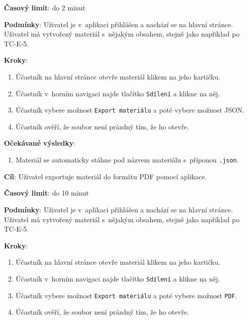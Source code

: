 \textbf{Časový limit}: do 2 minut

\textbf{Podmínky}:  Uživatel je v~aplikaci přihlášen a nachází se na hlavní stránce. Uživatel má vytvořený materiál s~nějakým obsahem, stejně jako například po TC-E-5.

\textbf{Kroky}:

\begin{enumerate}[leftmargin=1.4cm]
    \item Účastník na hlavní stránce otevře materiál klikem na jeho kartičku.
    \item Účastník v~horním navigaci najde tlačítko \verb|Sdílení| a klikne na něj.
    \item Účastník vybere možnost \verb|Export materiálu| a poté vybere možnost JSON.
    \item Účastník ověří, že soubor není prázdný tím, že ho otevře.
\end{enumerate}

\textbf{Očekávané výsledky}:

\begin{enumerate}[leftmargin=1.4cm]
    \item Materiál se automaticky stáhne pod názvem materiálu s~příponou \verb|.json|.
\end{enumerate}




\vspace{1em}

\textbf{Cíl}: Uživatel exportuje materiál do formátu PDF pomocí aplikace.

\textbf{Časový limit}: do 10 minut

\textbf{Podmínky}:  Uživatel je v~aplikaci přihlášen a nachází se na hlavní stránce. Uživatel má vytvořený materiál s~nějakým obsahem, stejně jako například po TC-E-5.

\textbf{Kroky}:

\begin{enumerate}[leftmargin=1.4cm]
    \item Účastník na hlavní stránce otevře materiál klikem na jeho kartičku.
    \item Účastník v~horním navigaci najde tlačítko \verb|Sdílení| a klikne na něj.
    \item Účastník vybere možnost \verb|Export materiálu| a poté vybere možnost \verb|PDF|.
    \item Účastník ověří, že soubor není prázdný tím, že ho otevře.
\end{enumerate}

